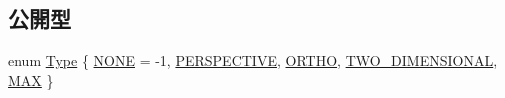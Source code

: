 \subsection*{公開型}
\begin{DoxyCompactItemize}
\item 
enum \mbox{\hyperlink{class_camera_a3b0a1f58deca679ac665f61c480d1dcb}{Type}} \{ \newline
\mbox{\hyperlink{class_camera_a3b0a1f58deca679ac665f61c480d1dcba12c79dd5dae61a931ff74c2855ec82f5}{N\+O\+NE}} = -\/1, 
\mbox{\hyperlink{class_camera_a3b0a1f58deca679ac665f61c480d1dcba34783417054408fd9e024048b1cefa47}{P\+E\+R\+S\+P\+E\+C\+T\+I\+VE}}, 
\mbox{\hyperlink{class_camera_a3b0a1f58deca679ac665f61c480d1dcba5421bcd519dac606b7af9786b11f88d6}{O\+R\+T\+HO}}, 
\mbox{\hyperlink{class_camera_a3b0a1f58deca679ac665f61c480d1dcbaa144a5dc97bc343a7ef630cf23b09a76}{T\+W\+O\+\_\+\+D\+I\+M\+E\+N\+S\+I\+O\+N\+AL}}, 
\newline
\mbox{\hyperlink{class_camera_a3b0a1f58deca679ac665f61c480d1dcba7a6334fc8418deee4c453e1c7a366efa}{M\+AX}}
 \}
\end{DoxyCompactItemize}
